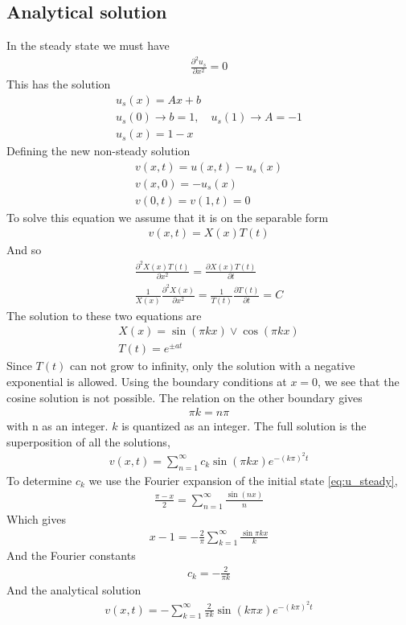 \documentclass[11pt,a4paper,draft]{article}
\numberwithin{equation}{section}
\begin{document}
\subsection{Analytical solution}
In the steady state we must have
\begin{gather}
\frac{\partial^2 u_s}{\partial x^2} = 0
\end{gather}
This has the solution
\begin{gather}
u_s(x) = Ax + b\\
u_s(0) \to b = 1, \quad
u_s(1) \to A = -1\\
u_s(x) = 1-x \label{eq:u_steady}
\end{gather}
Defining the new non-steady solution
\begin{gather}
v(x,t) = u(x,t) - u_s(x)\\
v(x,0) = -u_s(x)\\
v(0,t) = v(1, t) = 0
\end{gather}
To solve this equation we assume that it is on the separable form
\begin{gather}
v(x,t) = X(x)T(t)
\end{gather}
And so
\begin{gather}
\frac{\partial^2 X(x)T(t)}{\partial x^2}
= \frac{\partial X(x)T(t)}{\partial t}\\
\frac{1}{X(x)}\frac{\partial^2 X(x)}{\partial x^2}
 = \frac{1}{T(t)}\frac{\partial T(t)}{\partial t} = C
 \label{eq:coupled_constant}
\end{gather}
The solution to these two equations are 
\begin{gather}
X(x) = \sin(\pi kx) \lor \cos(\pi kx)\\
T(t) = e^{\pm at}
\end{gather}
Since $T(t)$ can not grow to infinity, only the solution with a 
negative exponential is allowed. Using the boundary conditions at 
$x=0$, we see that the cosine solution is not possible.
The relation on the other boundary gives 
\begin{gather}
\pi k = n\pi
\end{gather}
with n as an integer. $k$ is quantized as an integer. The full solution 
is the superposition of all the solutions,
\begin{gather}
v(x,t) = \sum_{n=1}^\infty c_k \sin(\pi kx)e^{-(k\pi)^2t}
\end{gather}
To determine $c_k$ we use the Fourier expansion of the initial 
state \eqref{eq:u_steady}, 
\begin{gather}
\frac{\pi - x}{2} = \sum_{n=1}^\infty \frac{\sin(nx)}{n}
\end{gather}
Which gives
\begin{gather}
x-1 = -\frac{2}{\pi}\sum_{k=1}^\infty \frac{\sin\pi kx}{k}
\end{gather}
And the Fourier constants
\begin{gather}
c_k = -\frac{2}{\pi k}
\end{gather}
And the analytical solution
\begin{gather}
v(x,t) = -\sum_{k=1}^\infty \frac{2}{\pi k}\sin(k\pi x)e^{-(k\pi)^2t}
\end{gather}
\end{document}
